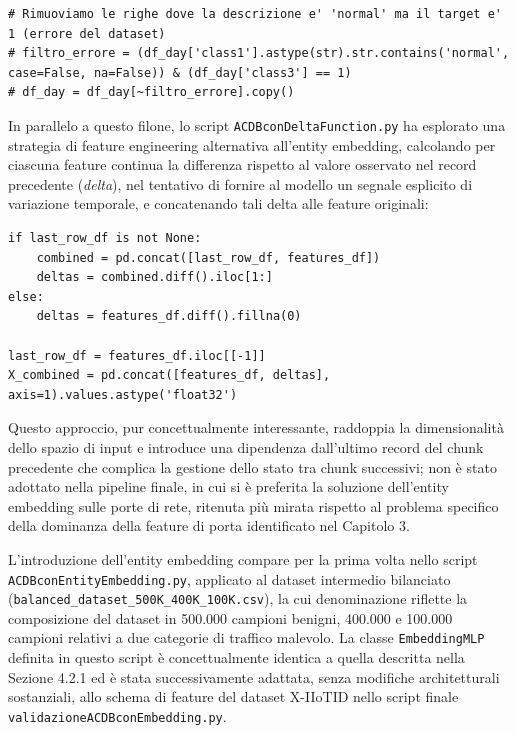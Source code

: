 \documentclass[12pt,a4paper]{report}
\begin{document}
\begin{lstlisting}[caption={Filtro (disattivato) delle etichette incoerenti, primo tentativo (\texttt{VersioneConAdam.py})}]
# Rimuoviamo le righe dove la descrizione e' 'normal' ma il target e' 1 (errore del dataset)
# filtro_errore = (df_day['class1'].astype(str).str.contains('normal', case=False, na=False)) & (df_day['class3'] == 1)
# df_day = df_day[~filtro_errore].copy()
\end{lstlisting}

In parallelo a questo filone, lo script \texttt{ACDBconDeltaFunction.py} ha esplorato una strategia di feature engineering alternativa all'entity embedding, calcolando per ciascuna feature continua la differenza rispetto al valore osservato nel record precedente (\emph{delta}), nel tentativo di fornire al modello un segnale esplicito di variazione temporale, e concatenando tali delta alle feature originali:

\begin{lstlisting}[caption={Calcolo delle feature differenziali (\texttt{ACDBconDeltaFunction.py})}]
if last_row_df is not None:
    combined = pd.concat([last_row_df, features_df])
    deltas = combined.diff().iloc[1:]
else:
    deltas = features_df.diff().fillna(0)

last_row_df = features_df.iloc[[-1]]
X_combined = pd.concat([features_df, deltas], axis=1).values.astype('float32')
\end{lstlisting}

Questo approccio, pur concettualmente interessante, raddoppia la dimensionalità dello spazio di input e introduce una dipendenza dall'ultimo record del chunk precedente che complica la gestione dello stato tra chunk successivi; non è stato adottato nella pipeline finale, in cui si è preferita la soluzione dell'entity embedding sulle porte di rete, ritenuta più mirata rispetto al problema specifico della dominanza della feature di porta identificato nel Capitolo 3.

L'introduzione dell'entity embedding compare per la prima volta nello script \texttt{ACDBconEntityEmbedding.py}, applicato al dataset intermedio bilanciato (\texttt{balanced\_dataset\_500K\_400K\_100K.csv}), la cui denominazione riflette la composizione del dataset in 500.000 campioni benigni, 400.000 e 100.000 campioni relativi a due categorie di traffico malevolo. La classe \texttt{EmbeddingMLP} definita in questo script è concettualmente identica a quella descritta nella Sezione 4.2.1 ed è stata successivamente adattata, senza modifiche architetturali sostanziali, allo schema di feature del dataset X-IIoTID nello script finale \texttt{validazioneACDBconEmbedding.py}.
\end{document}

